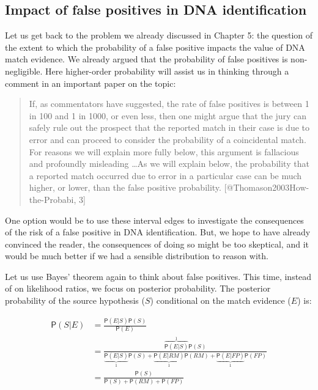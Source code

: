 \documentclass[
  10pt,
  dvipsnames,enabledeprecatedfontcommands]{scrartcl}
\newcommand{\pr}[1]{\mathsf{P}(#1)}
\begin{document}

\hypertarget{impact-of-false-positives-in-dna-identification}{%
\subsection{Impact of false positives in DNA
identification}\label{impact-of-false-positives-in-dna-identification}}

Let us get back to the problem we already discussed in Chapter 5: the
question of the extent to which the probability of a false positive
impacts the value of DNA match evidence. We already argued that the
probability of false positives is non-negligible. Here higher-order
probability will assist us in thinking through a comment in an important
paper on the topic:

\begin{quote}
If, as commentators have suggested, the rate of false positives is between 1 in 100 and 1 in 1000, or even less, then one might argue that the jury can safely rule out
the prospect that the reported match in their case is due to error and can proceed to consider the probability of a coincidental match. For reasons we will explain more fully below, this argument is fallacious and profoundly misleading \dots As we will explain below, the probability that a reported match occurred due to error in a particular case can be much higher, or lower, than the false positive probability. [@Thomason2003How-the-Probabi, 3]
\end{quote}

One option would be to use these interval edges to investigate the
consequences of the risk of a false positive in DNA identification. But,
we hope to have already convinced the reader, the consequences of doing
so might be too skeptical, and it would be much better if we had a
sensible distribution to reason with.

Let us use Bayes' theorem again to think about false positives. This
time, instead of on likelihood ratios, we focus on posterior
probability. The posterior probability of the source hypothesis (\(S\))
conditional on the match evidence (\(E\)) is:

\begin{align*}
\pr{S \vert E} &   =  \frac{\pr{E\vert S} \pr{S} } {\pr{E}}\\
& = \frac{\overbrace{\pr{E\vert S}}^1 \pr{S}}{\underbrace{\pr{E\vert S}}_1 \pr{S} + \underbrace{\pr{E \vert RM}}_1 \pr{RM} + \underbrace{\pr{E \vert FP}}_1 \pr{FP}} \\ & = \frac{\pr{S}}{\pr{S} + \pr{RM} + \pr{FP}} 
\end{align*}
\end{document}
